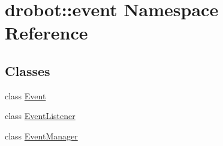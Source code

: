 \hypertarget{namespacedrobot_1_1event}{\section{drobot\-:\-:event Namespace Reference}
\label{namespacedrobot_1_1event}
}
\subsection*{Classes}
\begin{DoxyCompactItemize}
\item 
class \hyperlink{classdrobot_1_1event_1_1Event}{Event}
\item 
class \hyperlink{classdrobot_1_1event_1_1EventListener}{Event\-Listener}
\item 
class \hyperlink{classdrobot_1_1event_1_1EventManager}{Event\-Manager}
\end{DoxyCompactItemize}
